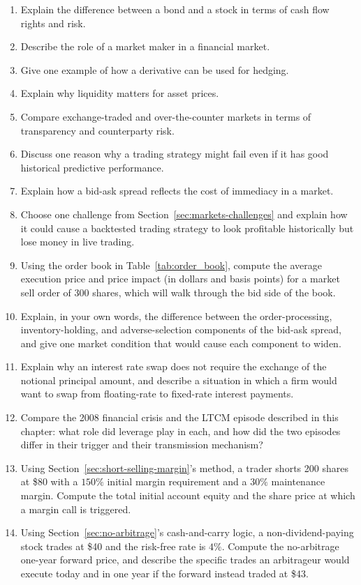 \documentclass[../ai_in_finance]{subfiles}
\begin{document}
\begin{enumerate}[exercises]
    \item Explain the difference between a bond and a stock in terms of cash flow rights and risk.
    \item Describe the role of a market maker in a financial market.
    \item Give one example of how a derivative can be used for hedging.
    \item Explain why liquidity matters for asset prices.
    \item Compare exchange-traded and over-the-counter markets in terms of transparency and counterparty risk.
    \item Discuss one reason why a trading strategy might fail even if it has good historical predictive performance.
    \item Explain how a bid-ask spread reflects the cost of immediacy in a market.
    \item Choose one challenge from Section~\ref{sec:markets-challenges} and explain how it could cause a backtested trading strategy to look profitable historically but lose money in live trading.
    \item Using the order book in Table~\ref{tab:order_book}, compute the average execution price and price impact (in dollars and basis points) for a market sell order of 300 shares, which will walk through the bid side of the book.
    \item Explain, in your own words, the difference between the order-processing, inventory-holding, and adverse-selection components of the bid-ask spread, and give one market condition that would cause each component to widen.
    \item Explain why an interest rate swap does not require the exchange of the notional principal amount, and describe a situation in which a firm would want to swap from floating-rate to fixed-rate interest payments.
    \item Compare the 2008 financial crisis and the LTCM episode described in this chapter: what role did leverage play in each, and how did the two episodes differ in their trigger and their transmission mechanism?
    \item Using Section~\ref{sec:short-selling-margin}'s method, a trader shorts 200 shares at \$80 with a $150\%$ initial margin requirement and a $30\%$ maintenance margin. Compute the total initial account equity and the share price at which a margin call is triggered.
    \item Using Section~\ref{sec:no-arbitrage}'s cash-and-carry logic, a non-dividend-paying stock trades at \$40 and the risk-free rate is $4\%$. Compute the no-arbitrage one-year forward price, and describe the specific trades an arbitrageur would execute today and in one year if the forward instead traded at \$43.

\end{enumerate}
\end{document}
